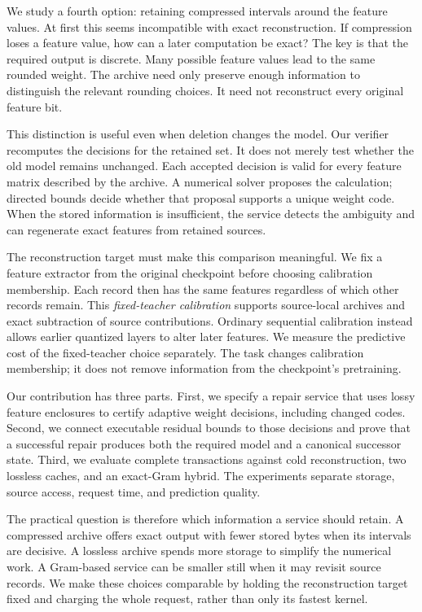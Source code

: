\documentclass[11pt,a4paper]{article}
\begin{document}
We study a fourth option: retaining compressed intervals around the feature
values. At first this seems incompatible with exact reconstruction. If compression
loses a feature value, how can a later computation be exact? The key is that the
required output is discrete. Many possible feature values lead to the same
rounded weight. The archive need only preserve enough information to distinguish
the relevant rounding choices. It need not reconstruct every original feature
bit.

This distinction is useful even when deletion changes the model. Our verifier
recomputes the decisions for the retained set. It does not merely test whether the
old model remains unchanged. Each accepted decision is valid for every feature
matrix described by the archive. A numerical solver proposes the calculation;
directed bounds decide whether that proposal supports a unique weight code.
When the stored information is insufficient, the service detects the ambiguity
and can regenerate exact features from retained sources.

The reconstruction target must make this comparison meaningful. We fix a feature
extractor from the original checkpoint before choosing calibration membership.
Each record then has the same features regardless of which other records remain.
This \emph{fixed-teacher calibration} supports source-local archives and exact
subtraction of source contributions. Ordinary sequential calibration instead
allows earlier quantized layers to alter later features. We measure the predictive
cost of the fixed-teacher choice separately. The task changes calibration
membership; it does not remove information from the checkpoint's pretraining.

Our contribution has three parts. First, we specify a repair service that uses
lossy feature enclosures to certify adaptive weight decisions, including changed
codes. Second, we connect executable residual bounds to those decisions and prove
that a successful repair produces both the required model and a canonical
successor state. Third, we evaluate complete transactions against cold
reconstruction, two lossless caches, and an exact-Gram hybrid. The experiments
separate storage, source access, request time, and prediction quality.

The practical question is therefore which information a service should retain.
A compressed archive offers exact output with fewer stored bytes when its
intervals are decisive. A lossless archive spends more storage to simplify the
numerical work. A Gram-based service can be smaller still when it may revisit
source records. We make these choices comparable by holding the reconstruction
target fixed and charging the whole request, rather than only its fastest kernel.
\end{document}
